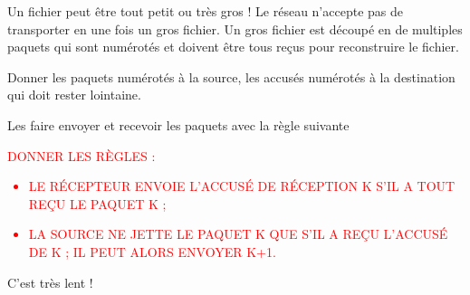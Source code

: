 \documentclass[10pt,a4paper]{article}
\begin{document}
Un fichier peut être tout petit ou très gros !  Le réseau n’accepte pas de
transporter en une fois un gros fichier. Un gros fichier est découpé en de
multiples paquets qui sont numérotés et doivent être tous reçus pour
reconstruire le fichier.


Donner les paquets numérotés à la source, les accusés numérotés à la
destination qui doit rester lointaine. 

Les faire envoyer et recevoir les paquets avec la règle suivante

\textcolor{red}{DONNER LES RÈGLES : 
  \begin{itemize}
    \item LE RÉCEPTEUR ENVOIE L’ACCUSÉ DE RÉCEPTION K S’IL A TOUT REÇU LE
      PAQUET K ; 
    \item LA SOURCE NE JETTE LE PAQUET K QUE S’IL A REÇU L’ACCUSÉ DE K ; IL
      PEUT ALORS ENVOYER K+1.
  \end{itemize}
}

C’est très lent !
\end{document}
